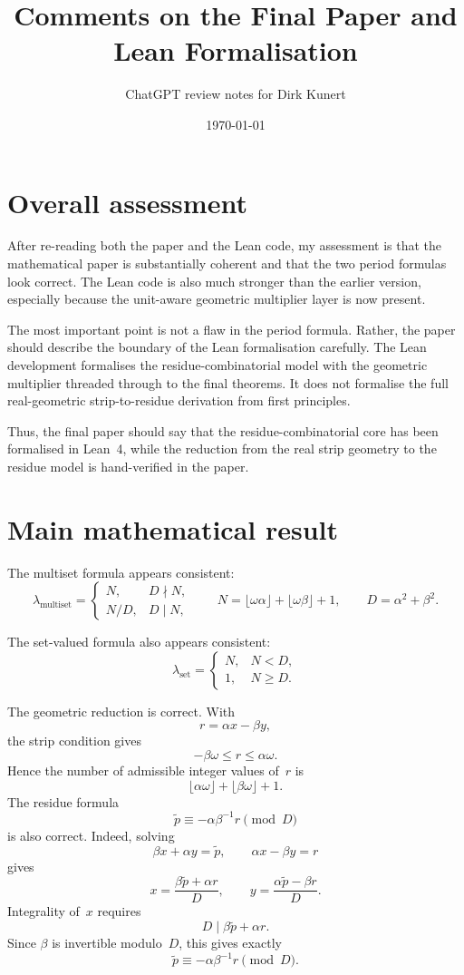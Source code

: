 \documentclass[11pt]{article}
\title{Comments on the Final Paper and Lean Formalisation}
\author{ChatGPT review notes for Dirk Kunert}
\date{\today}
\begin{document}
\maketitle

\section{Overall assessment}

After re-reading both the paper and the Lean code, my assessment is that the
mathematical paper is substantially coherent and that the two period formulas
look correct.  The Lean code is also much stronger than the earlier version,
especially because the unit-aware geometric multiplier layer is now present.

The most important point is not a flaw in the period formula.  Rather, the
paper should describe the boundary of the Lean formalisation carefully.  The
Lean development formalises the residue-combinatorial model with the geometric
multiplier threaded through to the final theorems.  It does not formalise the
full real-geometric strip-to-residue derivation from first principles.

Thus, the final paper should say that the residue-combinatorial core has been
formalised in Lean~4, while the reduction from the real strip geometry to the
residue model is hand-verified in the paper.

\section{Main mathematical result}

The multiset formula appears consistent:
\[
\lambda_{\mathrm{multiset}}=
\begin{cases}
N, & D\nmid N,\\
N/D, & D\mid N,
\end{cases}
\qquad
N=\lfloor\omega\alpha\rfloor+\lfloor\omega\beta\rfloor+1,
\qquad
D=\alpha^2+\beta^2.
\]

The set-valued formula also appears consistent:
\[
\lambda_{\mathrm{set}}=
\begin{cases}
N, & N<D,\\
1, & N\ge D.
\end{cases}
\]

The geometric reduction is correct.  With
\[
r=\alpha x-\beta y,
\]
the strip condition gives
\[
-\beta\omega\le r\le \alpha\omega.
\]
Hence the number of admissible integer values of~\(r\) is
\[
\lfloor\alpha\omega\rfloor+\lfloor\beta\omega\rfloor+1.
\]
The residue formula
\[
\widetilde p\equiv -\alpha\beta^{-1}r\pmod D
\]
is also correct.  Indeed, solving
\[
\beta x+\alpha y=\widetilde p,
\qquad
\alpha x-\beta y=r
\]
gives
\[
x=\frac{\beta\widetilde p+\alpha r}{D},
\qquad
 y=\frac{\alpha\widetilde p-\beta r}{D}.
\]
Integrality of~\(x\) requires
\[
D\mid \beta\widetilde p+\alpha r.
\]
Since \(\beta\) is invertible modulo~\(D\), this gives exactly
\[
\widetilde p\equiv -\alpha\beta^{-1}r\pmod D.
\]
\end{document}
